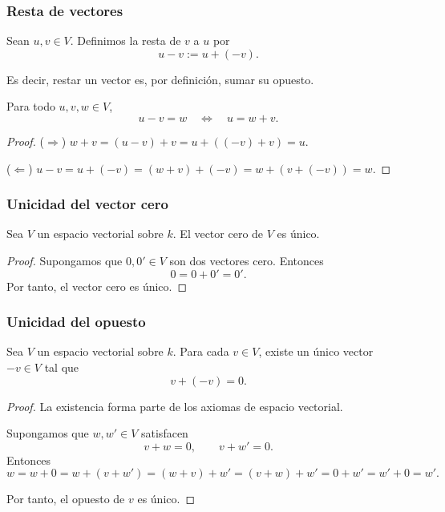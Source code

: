 \begin{frame}
    \frametitle{Resta de vectores}

    Sean $u,v\in V$. Definimos la \alert{resta} de $v$ a $u$ por
    \[
        u-v:=u+(-v).
    \]

    Es decir, restar un vector es, por definición, sumar su opuesto.

    \begin{proposition}
        Para todo $u,v,w\in V$,
        \[
            u-v=w \quad\Longleftrightarrow\quad u=w+v.
        \]
    \end{proposition}

    \begin{proof}
        ($\Rightarrow$) $w+v=(u-v)+v=u+((-v)+v)=u$.

        ($\Leftarrow$) $u-v=u+(-v)=(w+v)+(-v)=w+(v+(-v))=w$.
    \end{proof}
\end{frame}


\begin{frame}
    \frametitle{Unicidad del vector cero}

    \begin{proposition}
        Sea \(V\) un espacio vectorial sobre \(k\). El vector cero de \(V\) es único.
    \end{proposition}

    \begin{proof}
        Supongamos que \(0,0'\in V\) son dos vectores cero. Entonces
        \[
            0=0+0'=0'.
        \]
        Por tanto, el vector cero es único.
    \end{proof}
\end{frame}

\begin{frame}
    \frametitle{Unicidad del opuesto}

    \begin{proposition}
        Sea \(V\) un espacio vectorial sobre \(k\). Para cada \(v\in V\),
        existe un único vector \(-v\in V\) tal que
        \[
            v+(-v)=0.
        \]
    \end{proposition}

    \begin{proof}
        La existencia forma parte de los axiomas de espacio vectorial.

        Supongamos que \(w,w'\in V\) satisfacen
        \[
            v+w=0,
            \qquad
            v+w'=0.
        \]
        Entonces
        \[
            w
            =
            w+0
            =
            w+(v+w')
            =
            (w+v)+w'
            =
            (v+w)+w'
            =
            0+w'
            =
            w'+0
            =
            w'.
        \]

        Por tanto, el opuesto de \(v\) es único.
    \end{proof}
\end{frame}

